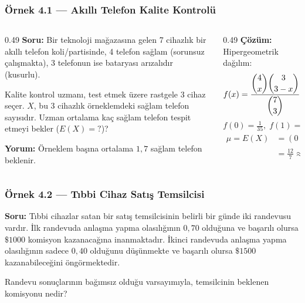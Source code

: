 \documentclass[light]{lutbeamer}
\begin{document}
\begin{frame}[fragile]
  \frametitle[Örnek 4.1]{Örnek 4.1 --- Akıllı Telefon Kalite Kontrolü}

  \smallskip
  \begin{columns}[T,onlytextwidth]
    \begin{column}{0.49\textwidth}
      \footnotesize
      \textbf{Soru:} Bir teknoloji mağazasına gelen 7 cihazlık bir akıllı telefon
      koli/partisinde, 4 telefon sağlam (sorunsuz çalışmakta), 3 telefonun ise
      bataryası arızalıdır (kusurlu).

      \smallskip
      Kalite kontrol uzmanı, test etmek üzere rastgele 3 cihaz seçer.
      $X$, bu 3 cihazlık örneklemdeki sağlam telefon sayısıdır.
      Uzman ortalama kaç sağlam telefon tespit etmeyi bekler ($E(X)=?$)?


      \vspace{5em}
      \textbf{Yorum:} Örneklem başına ortalama
      $1{,}7$ sağlam telefon beklenir.
    \end{column}



    \begin{column}{0.49\textwidth}
      \footnotesize
      \vspace{-2.6em}
      \textbf{Çözüm:} Hipergeometrik dağılım:
      \[
      f(x)=\dfrac{\dbinom{4}{x}\dbinom{3}{3-x}}{\dbinom{7}{3}},
      \quad x=0,1,2,3
      \]
      \[
      f(0)=\tfrac{1}{35},\;
      f(1)=\tfrac{12}{35},\;
      f(2)=\tfrac{18}{35},\;
      f(3)=\tfrac{4}{35}
      \]
      \begin{align*}
        \mu=E(X)
        &= (0)\!\left(\tfrac{1}{35}\right)
         + (1)\!\left(\tfrac{12}{35}\right)
         + (2)\!\left(\tfrac{18}{35}\right)
         + (3)\!\left(\tfrac{4}{35}\right)\\
        &= \frac{12}{7}\approx 1{,}7
      \end{align*}
    \end{column}
  \end{columns}
\end{frame}

\begin{frame}[fragile]
  \frametitle[Örnek 4.2]{Örnek 4.2 --- Tıbbi Cihaz Satış Temsilcisi}

  \smallskip
  \textbf{Soru:} Tıbbi cihazlar satan bir satış temsilcisinin belirli bir günde iki randevusu vardır.
  İlk randevuda anlaşma yapma olasılığının $0{,}70$ olduğuna ve başarılı olursa $\$1000$ komisyon kazanacağına inanmaktadır. İkinci randevuda anlaşma yapma olasılığının sadece $0{,}40$ olduğunu düşünmekte ve başarılı olursa $\$1500$ kazanabileceğini öngörmektedir. 
  
  \medskip
  Randevu sonuçlarının bağımsız olduğu varsayımıyla, temsilcinin beklenen komisyonu nedir?
\end{frame}
\end{document}
